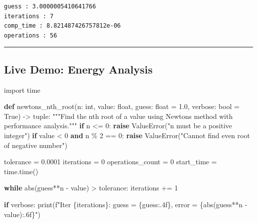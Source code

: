 \documentclass[
  letterpaper,
  DIV=11,
  numbers=noendperiod]{scrartcl}
\newenvironment{Shaded}{\begin{snugshade}}{\end{snugshade}}
\newcommand{\BuiltInTok}[1]{\textcolor[rgb]{0.00,0.23,0.31}{#1}}
\newcommand{\CommentTok}[1]{\textcolor[rgb]{0.37,0.37,0.37}{#1}}
\newcommand{\ControlFlowTok}[1]{\textcolor[rgb]{0.00,0.23,0.31}{\textbf{#1}}}
\newcommand{\DecValTok}[1]{\textcolor[rgb]{0.68,0.00,0.00}{#1}}
\newcommand{\FloatTok}[1]{\textcolor[rgb]{0.68,0.00,0.00}{#1}}
\newcommand{\ImportTok}[1]{\textcolor[rgb]{0.00,0.46,0.62}{#1}}
\newcommand{\KeywordTok}[1]{\textcolor[rgb]{0.00,0.23,0.31}{\textbf{#1}}}
\newcommand{\NormalTok}[1]{\textcolor[rgb]{0.00,0.23,0.31}{#1}}
\newcommand{\OperatorTok}[1]{\textcolor[rgb]{0.37,0.37,0.37}{#1}}
\newcommand{\PreprocessorTok}[1]{\textcolor[rgb]{0.68,0.00,0.00}{#1}}
\newcommand{\SpecialCharTok}[1]{\textcolor[rgb]{0.37,0.37,0.37}{#1}}
\newcommand{\SpecialStringTok}[1]{\textcolor[rgb]{0.13,0.47,0.30}{#1}}
\newcommand{\StringTok}[1]{\textcolor[rgb]{0.13,0.47,0.30}{#1}}
\newcommand{\VariableTok}[1]{\textcolor[rgb]{0.07,0.07,0.07}{#1}}
\begin{document}
\begin{verbatim}
guess : 3.0000005410641766
iterations : 7
comp_time : 8.821487426757812e-06
operations : 56
\end{verbatim}

\begin{center}\rule{0.5\linewidth}{0.5pt}\end{center}

\subsection{Live Demo: Energy Analysis}\label{live-demo-energy-analysis}

\begin{Shaded}
\begin{Highlighting}[]
\ImportTok{import}\NormalTok{ time}

\KeywordTok{def}\NormalTok{ newtons\_nth\_root(n: }\BuiltInTok{int}\NormalTok{, value: }\BuiltInTok{float}\NormalTok{, guess: }\BuiltInTok{float} \OperatorTok{=} \FloatTok{1.0}\NormalTok{, verbose: }\BuiltInTok{bool} \OperatorTok{=} \VariableTok{True}\NormalTok{) }\OperatorTok{{-}\textgreater{}} \BuiltInTok{tuple}\NormalTok{:}
    \CommentTok{"""Find the nth root of a value using Newton\textquotesingle{}s method with performance analysis."""}
    \ControlFlowTok{if}\NormalTok{ n }\OperatorTok{\textless{}=} \DecValTok{0}\NormalTok{:}
        \ControlFlowTok{raise} \PreprocessorTok{ValueError}\NormalTok{(}\StringTok{"n must be a positive integer"}\NormalTok{)}
    \ControlFlowTok{if}\NormalTok{ value }\OperatorTok{\textless{}} \DecValTok{0} \KeywordTok{and}\NormalTok{ n }\OperatorTok{\%} \DecValTok{2} \OperatorTok{==} \DecValTok{0}\NormalTok{:}
        \ControlFlowTok{raise} \PreprocessorTok{ValueError}\NormalTok{(}\StringTok{"Cannot find even root of negative number"}\NormalTok{)}
    
\NormalTok{    tolerance }\OperatorTok{=} \FloatTok{0.0001}
\NormalTok{    iterations }\OperatorTok{=} \DecValTok{0}
\NormalTok{    operations\_count }\OperatorTok{=} \DecValTok{0}
\NormalTok{    start\_time }\OperatorTok{=}\NormalTok{ time.time()}
    
    \ControlFlowTok{while} \BuiltInTok{abs}\NormalTok{(guess}\OperatorTok{**}\NormalTok{n }\OperatorTok{{-}}\NormalTok{ value) }\OperatorTok{\textgreater{}}\NormalTok{ tolerance:}
\NormalTok{        iterations }\OperatorTok{+=} \DecValTok{1}
        
        \ControlFlowTok{if}\NormalTok{ verbose:}
            \BuiltInTok{print}\NormalTok{(}\SpecialStringTok{f"Iter }\SpecialCharTok{\{}\NormalTok{iterations}\SpecialCharTok{\}}\SpecialStringTok{: guess = }\SpecialCharTok{\{}\NormalTok{guess}\SpecialCharTok{:.4f\}}\SpecialStringTok{, error = }\SpecialCharTok{\{}\BuiltInTok{abs}\NormalTok{(guess}\OperatorTok{**}\NormalTok{n }\OperatorTok{{-}}\NormalTok{ value)}\SpecialCharTok{:.6f\}}\SpecialStringTok{"}\NormalTok{)}
        

\end{Highlighting}
\end{Shaded}
\end{document}
